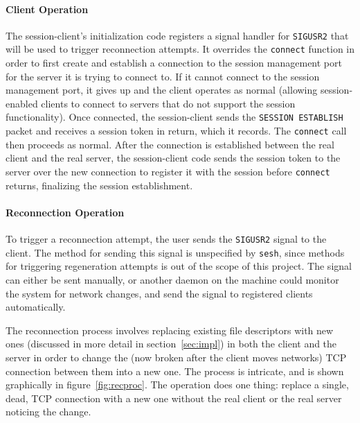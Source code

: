 \documentclass[twocolumn,11pt]{article}
\newcommand{\sesh}{\texttt{sesh}\xspace}
\begin{document}
\paragraph{Client Operation}
The session-client's initialization code registers a signal handler for
\texttt{SIGUSR2} that will be used to trigger reconnection attempts. It
overrides the \texttt{connect} function in order to first create and establish a
connection to the session management port for the server it is trying to connect
to. If it cannot connect to the session management port, it gives up and the
client operates as normal (allowing session-enabled clients to connect to
servers that do not support the session functionality). Once connected, the
session-client sends the \texttt{SESSION ESTABLISH} packet and receives a
session token in return, which it records. The \texttt{connect} call then proceeds as
normal. After the connection is established between the real client and the real
server, the session-client code sends the session token to the server over the
new connection to register it with the session before
\texttt{connect} returns, finalizing the session establishment.


\paragraph{Reconnection Operation}
To trigger a reconnection attempt, the user sends the \texttt{SIGUSR2} signal to
the client. The method for sending this signal is unspecified by \sesh, since
methods for triggering regeneration attempts is out of the scope of this
project. The signal can
either be sent manually, or another daemon on the machine could monitor the
system for network changes, and send the signal to registered clients
automatically.

The reconnection process involves replacing existing file descriptors with new
ones (discussed in more detail in section~\ref{sec:impl}) in both the client and
the server in order to change the (now broken after the client moves networks)
TCP connection between them into a new one. The process is intricate, and is
shown graphically in figure~\ref{fig:recproc}. The operation does one thing:
replace a single, dead, TCP connection with a new one without the real client or
the real server noticing the change.
\end{document}
